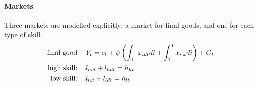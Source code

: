 \paragraph{Markets}
Three markets are modelled explicitly: a market for final goods, and one for each type of skill.
\begin{align*}
\text{final good}\hspace{4mm}& Y_{t}=c_t+\psi\left(\int_{0}^1x_{idt}di+\int_{0}^1x_{ict}di\right)+ G_t\\
\text{high skill:}\hspace{4mm}& l_{hct}+l_{hdt}=h_{ht}\\
\text{low skill:}\hspace{4mm}&l_{lct}+l_{ldt}=h_{lt}.
\end{align*}







